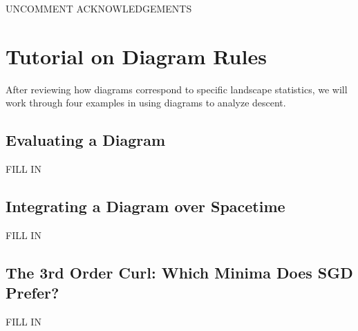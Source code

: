 \documentclass{article}
\begin{document}
{\color{moor} UNCOMMENT ACKNOWLEDGEMENTS}


\newpage
    
    


\renewcommand{\thesection}{\Alph{section}}
\setcounter{section}{0}

\section{Tutorial on Diagram Rules} \label{sect:tutorial}

    After reviewing how diagrams correspond to specific landscape statistics,
    we will work through four examples in using diagrams to analyze descent.

    \subsection{Evaluating a Diagram}
        {\color{moor} FILL IN}
    \subsection{Integrating a Diagram over Spacetime}
        {\color{moor} FILL IN}
    \subsection{The 3rd Order Curl: Which Minima Does SGD Prefer?}
        {\color{moor} FILL IN}
\end{document}
